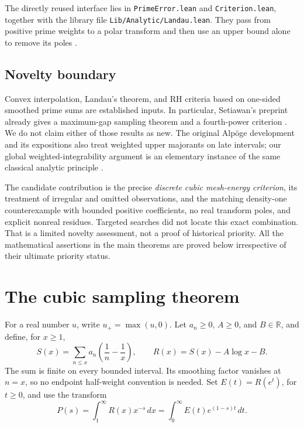 \documentclass[11pt,a4paper]{article}
\theoremstyle{definition}
\theoremstyle{remark}
\numberwithin{equation}{section}
\begin{document}
The directly reused interface lies in
\texttt{PrimeError.lean} and \texttt{Criterion.lean}, together with
the library file \nolinkurl{Lib/Analytic/Landau.lean}. They pass from positive prime
weights to a polar transform and then use an upper bound alone to
remove its poles \cite{primeerror,criterion,landaucode}.

\subsection{Novelty boundary}

Convex interpolation, Landau's theorem, and RH criteria based on
one-sided smoothed prime sums are established inputs. In particular,
Setiawan's preprint already gives a maximum-gap sampling theorem and a
fourth-power criterion \cite{setiawan}. We do not claim either of
those results as new. The original Alp\"oge development and its
expositions also treat weighted upper majorants on late intervals;
our global weighted-integrability argument is an elementary instance
of the same classical analytic principle \cite{rubinstein,odesky}.

The candidate contribution is the precise \emph{discrete cubic
mesh-energy criterion}, its treatment of irregular and omitted
observations, and the matching density-one counterexample with bounded
positive coefficients, no real transform poles, and explicit nonreal
residues. Targeted searches did not locate this exact combination.
That is a limited novelty assessment, not a proof of historical
priority. All the mathematical assertions in the main theorems are
proved below irrespective of their ultimate priority status.

\section{The cubic sampling theorem}
\label{sec:main}

For a real number \(u\), write \(u_+=\max(u,0)\). Let \(a_n\geq0\),
\(A\geq0\), and \(B\in\mathbb R\), and define, for \(x\geq1\),
\begin{equation}
 S(x)=\sum_{n\leq x}a_n\left(\frac1n-\frac1x\right),
 \qquad R(x)=S(x)-A\log x-B.
 \label{eq:remainder}
\end{equation}
The sum is finite on every bounded interval. Its smoothing factor
vanishes at \(n=x\), so no endpoint half-weight convention is needed.
Set \(E(t)=R(e^t)\), for \(t\geq0\), and use the transform
\begin{equation}
 P(s)=\int_1^\infty R(x)x^{-s}\,dx
     =\int_0^\infty E(t)e^{(1-s)t}\,dt.
 \label{eq:transform}
\end{equation}
\end{document}
